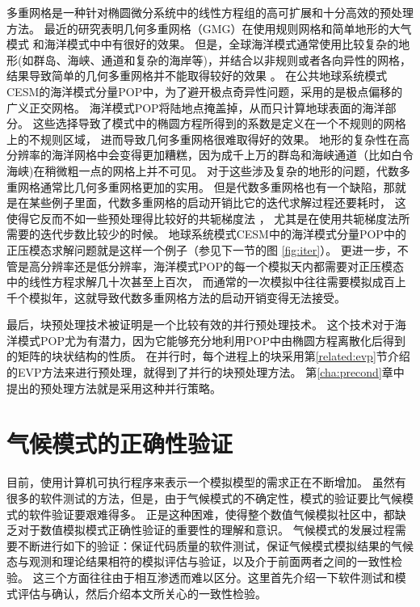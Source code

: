 多重网格是一种针对椭圆微分系统中的线性方程组的高可扩展和十分高效的预处理方法。 
最近的研究表明几何多重网格（GMG）在使用规则网格和简单地形的大气模式
 \cite{muller2014massively}和海洋模式中\cite{matsumura2008non,kanarska2007algorithm}中有很好的效果。 
但是，全球海洋模式通常使用比较复杂的地形(如群岛、海峡、通道和复杂的海岸等)，并结合以非规则或者各向异性的网格， 结果导致简单的几何多重网格并不能取得较好的效果
\cite{matsumura2008non,fulton1986multigrid,tseng2003ghost,stuben2001review}。 
在公共地球系统模式CESM的海洋模式分量POP中，为了避开极点奇异性问题，采用的是极点偏移的广义正交网格。 
海洋模式POP将陆地点掩盖掉，从而只计算地球表面的海洋部分。
这些选择导致了模式中的椭圆方程所得到的系数是定义在一个不规则的网格上的不规则区域， 进而导致几何多重网格很难取得好的效果。 
地形的复杂性在高分辨率的海洋网格中会变得更加糟糕，因为成千上万的群岛和海峡通道（比如白令海峡)在稍微粗一点的网格上并不可见。
对于这些涉及复杂的地形的问题，代数多重网格通常比几何多重网格更加的实用。 
但是代数多重网格也有一个缺陷，那就是在某些例子里面，代数多重网格的启动开销比它的迭代求解过程还要耗时，
这使得它反而不如一些预处理得比较好的共轭梯度法
\cite{muller2014massively}， 尤其是在使用共轭梯度法所需要的迭代步数比较少的时候。 
地球系统模式CESM中的海洋模式分量POP中的正压模态求解问题就是这样一个例子（参见下一节的图
 \ref{fig:iter}）。
更进一步，不管是高分辨率还是低分辨率，海洋模式POP的每一个模拟天内都需要对正压模态中的线性方程求解几十次甚至上百次，
而通常的一次模拟中往往需要模拟成百上千个模拟年，这就导致代数多重网格方法的启动开销变得无法接受。


最后，块预处理技术被证明是一个比较有效的并行预处理技术\cite{concus1985block, white2011block}。
这个技术对于海洋模式POP尤为有潜力，因为它能够充分地利用POP中由椭圆方程离散化后得到的矩阵的块状结构的性质。
在并行时，每个进程上的块采用第\ref{related:evp}节介绍的EVP方法来进行预处理，就得到了并行的块预处理方法。
第\ref{cha:precond}章中提出的预处理方法就是采用这种并行策略。

\section{气候模式的正确性验证}
\label{related:verify}

目前，使用计算机可执行程序来表示一个模拟模型的需求正在不断增加。 
虽然有很多的软件测试的方法，但是，由于气候模式的不确定性，模式的验证要比气候模式的软件验证要艰难得多。
正是这种困难，使得整个数值气候模拟社区中，都缺乏对于数值模拟模式正确性验证的重要性的理解和意识\cite{whitner1989guidelines}。 
气候模式的发展过程需要不断进行如下的验证：保证代码质量的软件测试，保证气候模式模拟结果的气候态与观测和理论结果相符的模拟评估与验证，以及介于前面两者之间的一致性检验\cite{whitner1989guidelines,wittenberg2014enso,baker2015,oreskes1994verification}。
这三个方面往往由于相互渗透而难以区分。这里首先介绍一下软件测试和模式评估与确认，然后介绍本文所关心的一致性检验。

